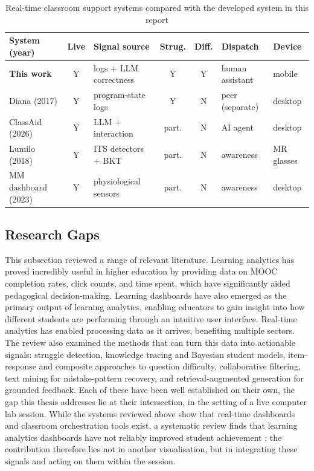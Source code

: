 \begin{table}[H]
\centering
\small
\setlength{\tabcolsep}{4pt}
\begin{tabular}{|l|c|l|c|c|l|l|}
\hline
System (year) & Live & Signal source & Strug. & Diff. & Dispatch & Device \\
\hline\hline
\textbf{This work} & Y & logs + LLM correctness & Y & Y & human assistant & mobile \\
\hline
Diana (2017) & Y & program-state logs & Y & N & peer (separate) & desktop \\
\hline
ClassAid (2026) & Y & LLM + interaction & part. & N & AI agent & desktop \\
\hline
Lumilo (2018) & Y & ITS detectors + BKT & part. & N & awareness & MR glasses \\
\hline
MM dashboard (2023) & Y & physiological sensors & part. & N & awareness & desktop \\
\hline
\end{tabular}
\caption{Real-time classroom support systems compared with the developed system in this report}
\label{tab:rt-systems}
\end{table}


\subsection{Research Gaps}

This subsection reviewed a range of relevant literature. Learning analytics has proved incredibly useful in higher education by providing data on MOOC completion rates, click counts, and time spent, which have significantly aided pedagogical decision-making. Learning dashboards have also emerged as the primary output of learning analytics, enabling educators to gain insight into how different students are performing through an intuitive user interface. Real-time analytics has enabled processing data as it arrives, benefiting multiple sectors. 
The review also examined the methods that can turn this data into actionable signals: struggle detection, knowledge tracing and Bayesian student models, item-response and composite approaches to question difficulty, collaborative filtering, text mining for mistake-pattern recovery, and retrieval-augmented generation for grounded feedback. 
Each of these have been well established on their own, the gap this thesis addresses lie at their intersection, in the setting of a live computer lab session. 
While the systems reviewed above show that real-time dashboards and classroom orchestration tools exist, a systematic review finds that learning analytics dashboards have not reliably improved student achievement \cite{kaliisaHaveLearningAnalytics2024}; the contribution therefore lies not in another visualisation, but in integrating these signals and acting on them within the session.

